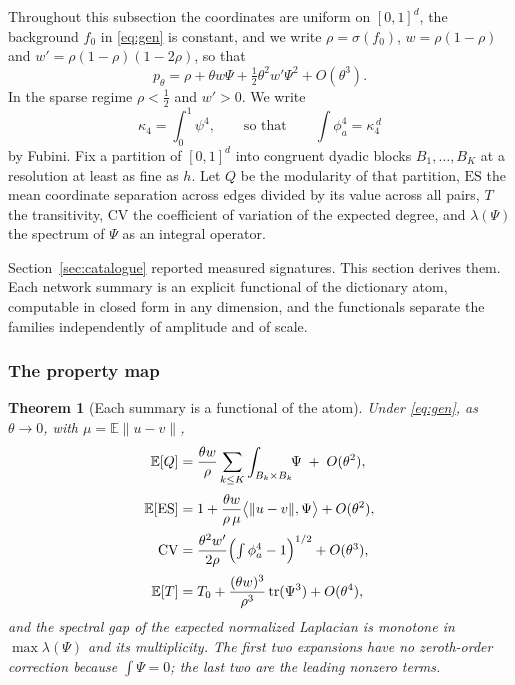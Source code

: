 \documentclass[11pt]{article}
\newtheorem{theorem}{Theorem}[section]
\theoremstyle{definition}
\newcommand{\1}{\mathbf 1}\newcommand{\op}{\operatorname}
\begin{document}
Throughout this subsection the coordinates are uniform on $[0,1]^d$, the
background $f_0$ in \eqref{eq:gen} is constant, and we write $\rho=\sigma(f_0)$,
$w=\rho(1-\rho)$ and $w'=\rho(1-\rho)(1-2\rho)$, so that
\begin{equation}
p_\theta=\rho+\theta w\Psi+\tfrac12\theta^{2}w'\Psi^{2}+O(\theta^{3}).
\label{app:eq-expand}
\end{equation}
In the sparse regime $\rho<\tfrac12$ and $w'>0$.  We write
\begin{equation}
\kappa_4=\int_0^1\psi^{4},\qquad\text{so that}\qquad\int\phi_a^{4}=\kappa_4^{\,d}
\label{app:eq-kappa4}
\end{equation}
by Fubini.  Fix a partition of $[0,1]^d$ into congruent dyadic blocks
$B_1,\dots,B_K$ at a resolution at least as fine as $h$.  Let $Q$ be the
modularity of that partition, $\mathrm{ES}$ the mean coordinate separation
across edges divided by its value across all pairs, $T$ the transitivity,
$\mathrm{CV}$ the coefficient of variation of the expected degree, and
$\lambda(\Psi)$ the spectrum of $\Psi$ as an integral operator.



Section~\ref{sec:catalogue} reported measured signatures.  This section derives
them.  Each network summary is an explicit functional of the dictionary
atom, computable in closed form in any dimension, and the functionals
separate the families independently of amplitude and of scale.

\subsubsection{The property map}

\begin{theorem}[Each summary is a functional of the atom]\label{app:thm-map}
Under \eqref{eq:gen}, as $\theta\to0$, with $\mu=\mathbb E\|u-v\|$,
\begin{align}
\mathbb E[Q]&=\frac{\theta w}{\rho}\sum_{k\le K}\int_{B_k\times B_k}\!\!\Psi\;+\;O(\theta^{2}),
\label{app:eq-mapQ}\\[2pt]
\mathbb E[\mathrm{ES}]&=1+\frac{\theta w}{\rho\,\mu}\bigl\langle\|u-v\|,\Psi\bigr\rangle+O(\theta^{2}),
\label{app:eq-mapES}\\[2pt]
\mathrm{CV}&=\frac{\theta^{2}w'}{2\rho}\Bigl(\textstyle\int\phi_a^{4}-1\Bigr)^{1/2}+O(\theta^{3}),
\label{app:eq-mapCV}\\[2pt]
\mathbb E[T]&=T_0+\frac{(\theta w)^{3}}{\rho^{3}}\operatorname{tr}(\Psi^{3})+O(\theta^{4}),
\label{app:eq-mapT}
\end{align}
and the spectral gap of the expected normalized Laplacian is monotone in
$\max\lambda(\Psi)$ and its multiplicity.  The first two expansions have no
zeroth-order correction because $\int\Psi=0$; the last two are the leading
nonzero terms.
\end{theorem}
\end{document}
